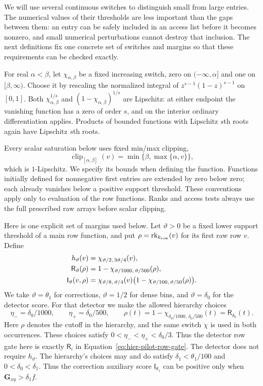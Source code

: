 \documentclass[11pt]{article}
\numberwithin{equation}{section}
\theoremstyle{definition}
\theoremstyle{remark}
\begin{document}
We will use several continuous switches to distinguish small from large entries. The numerical values of their thresholds are less important than the gaps between them: an entry can be safely included in an access list before it becomes nonzero, and small numerical perturbations cannot destroy that inclusion. The next definitions fix one concrete set of switches and margins so that these requirements can be checked exactly.

For real $\alpha<\beta$, let $\chi_{\alpha,\beta}$ be a fixed increasing
switch, zero on $(-\infty,\alpha]$ and one on $[\beta,\infty)$.
Choose it by rescaling the normalized integral of
$z^{s-1}(1-z)^{s-1}$ on $[0,1]$.
Both $\chi_{\alpha,\beta}^{1/s}$ and
$(1-\chi_{\alpha,\beta})^{1/s}$ are Lipschitz: at either endpoint the
vanishing function has a zero of order $s$, and on the interior ordinary
differentiation applies.  Products of bounded functions with Lipschitz
$s$th roots again have Lipschitz $s$th roots.

Every scalar saturation below uses fixed min/max clipping,
\[
 \operatorname{clip}_{[\alpha,\beta]}(v)
   =\min\{\beta,\max\{\alpha,v\}\},
\]
which is $1$-Lipschitz.  We specify its bounds when defining the function.
Functions initially defined for nonnegative first entries are extended
by zero below zero; each already vanishes below a positive support
threshold.  These conventions apply only to evaluation of the row
functions.  Ranks and access tests always use the full prescribed raw
arrays before scalar clipping.

Here is one explicit set of margins used below.  Let $\vartheta>0$ be a
fixed lower support threshold of a main row function, and put
$\rho=\operatorname{rk}_{k_{\rm row}}(v)$ for its first raw row $v$.  Define
\begin{align}
 h_{\vartheta}(v)
   &=\chi_{\vartheta/2,\,3\vartheta/4}(v),\notag\\
 {\mathsf{R}}_{\vartheta}(\rho)
   &=1-\chi_{\vartheta/1000,\,\vartheta/500}(\rho),\notag\\
 {\mathsf{I}}_{\vartheta}(v,\rho)
   &=\chi_{\vartheta/8,\,\vartheta/4}(v)
       \bigl(1-\chi_{\vartheta/100,\,\vartheta/50}(\rho)\bigr).
 \label{eq:atom-threshold-template}
\end{align}
We take $\vartheta=\theta_1$ for corrections, $\vartheta=1/2$ for dense
bins, and $\vartheta=\delta_0$ for the detector score.  For that detector
we make the allowed hierarchy choices
\[
 \eta_-=\delta_0/1000,\qquad \eta_+=\delta_0/500,\qquad
 \rho(t)=1-\chi_{\delta_0/1000,\,\delta_0/500}(t)
          ={\mathsf{R}}_{\delta_0}(t).
\]
Here $\rho$ denotes the cutoff in the hierarchy, and the same switch
$\chi$ is used in both occurrences.  These choices satisfy
$0<\eta_-<\eta_+<\delta_0/3$.  Thus the detector row gate here is exactly
${\mathsf{R}}_i$ in Equation~\eqref{eq:hier-pilot-row-gate}.
The detector does not require $h_{\vartheta}$.
The hierarchy's choices may and do satisfy
$\delta_1<\theta_1/100$ and $0<\delta_0<\delta_1$.
Thus the correction auxiliary score ${\mathsf{I}}_{\theta_1}$ can be positive only
when ${\mathbf{G}}_{xy}>\delta_1 f$.
\end{document}
